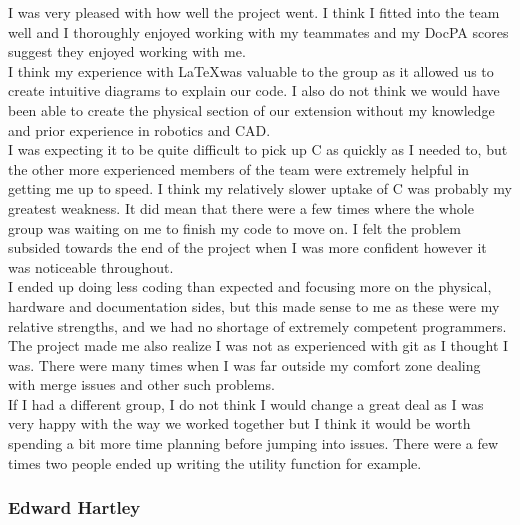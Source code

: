 \documentclass[8pt]{article}
\begin{document}
I was very pleased with how well the project went. I think I fitted into the team well and I thoroughly enjoyed working 
with my teammates and my DocPA scores suggest they enjoyed working with me. \\ I 
think my experience with \LaTeX \space was valuable to the group as it allowed us 
to create intuitive diagrams to explain our code. I also do not think we would have 
been able to create the physical section of our extension without my knowledge and 
prior experience in robotics and CAD.\\ I was expecting it to be quite difficult to 
pick up C as quickly as I needed to, but the other more experienced members of the 
team were extremely helpful in getting me up to speed. I think my relatively slower 
uptake of C was probably my greatest weakness. It did mean that there were a few times 
where the whole group was waiting on me to finish my code to move on. I felt the problem 
subsided towards the end of the project when I was more confident however it was noticeable 
throughout. \\ I ended up doing less coding than expected and focusing more on the physical, 
hardware and documentation sides, but this made sense to me as these were my relative strengths,
 and we had no shortage of extremely competent programmers. \\The project made me
also realize I was not as experienced with git as I thought I was. There were 
many times when I was far outside my comfort zone dealing with merge issues and 
other such problems.\\ If I had a different group, I do not think I would change 
a great deal as I was very happy with the way we worked together but I think it would
 be worth spending a bit more time planning before jumping into issues. There were a
  few times two people ended up writing the utility function for example. 



\subsubsection{Edward Hartley}
\end{document}

